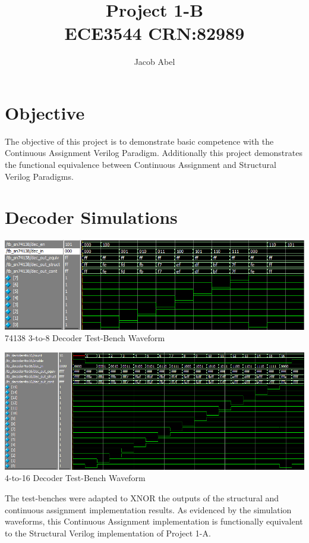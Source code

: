 \documentclass[12pt,letterpaper,titlepage]{article}
\author{Jacob Abel}
\title{	Project 1-B
	\\\large ECE3544 CRN:82989
}
\begin{document}


\maketitle
\begin{raggedright}

\section*{Objective}

The objective of this project is to demonstrate basic competence with the Continuous Assignment Verilog Paradigm. Additionally this project demonstrates the functional equivalence between Continuous Assignment and Structural Verilog Paradigms.

\section{Decoder Simulations}
\begin{center}
\includegraphics[width=\textwidth]{tb_3to8}
74138 3-to-8 Decoder Test-Bench Waveform
\end{center}

\begin{center}
\includegraphics[width=\textwidth, height=\textheight, keepaspectratio=true]{tb_4to16}
4-to-16 Decoder Test-Bench Waveform
\end{center}

The test-benches were adapted to XNOR the outputs of the structural and continuous assignment implementation results. As evidenced by the simulation waveforms, this Continuous Assignment implementation is functionally equivalent to the Structural Verilog implementation of Project 1-A.


\end{raggedright}
\end{document}
